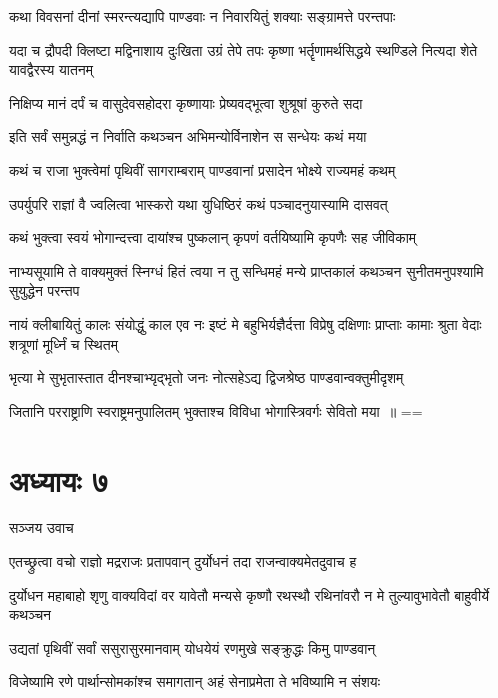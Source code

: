 \twolineshloka
{कथा विवसनां दीनां स्मरन्त्यद्यापि पाण्डवाः}
{न निवारयितुं शक्याः सङ्ग्रामत्ते परन्तपाः}


\threelineshloka
{यदा च द्रौपदी क्लिष्टा मद्विनाशाय दुःखिता}
{उग्रं तेपे तपः कृष्णा भर्तॄणामर्थसिद्धये}
{स्थण्डिले नित्यदा शेते यावद्वैरस्य यातनम्}


\twolineshloka
{निक्षिप्य मानं दर्पं च वासुदेवसहोदरा}
{कृष्णायाः प्रेष्यवद्भूत्वा शुश्रूषां कुरुते सदा}


\twolineshloka
{इति सर्वं समुन्नद्धं न निर्वाति कथञ्चन}
{अभिमन्योर्विनाशेन स सन्धेयः कथं मया}


\twolineshloka
{कथं च राजा भुक्त्वेमां पृथिवीं सागराम्बराम्}
{पाण्डवानां प्रसादेन भोक्ष्ये राज्यमहं कथम्}


\twolineshloka
{उपर्युपरि राज्ञां वै ज्वलित्वा भास्करो यथा}
{युधिष्ठिरं कथं पञ्चादनुयास्यामि दासवत्}


\twolineshloka
{कथं भुक्त्वा स्वयं भोगान्दत्त्वा दायांश्च पुष्कलान्}
{कृपणं वर्तयिष्यामि कृपणैः सह जीविकाम्}


नाभ्यसूयामि ते वाक्यमुक्तं स्निग्धं हितं त्वया
\twolineshloka
{न तु सन्धिमहं मन्ये प्राप्तकालं कथञ्चन}
{सुनीतमनुपश्यामि सुयुद्धेन परन्तप}


नायं क्लीबायितुं कालः संयोद्धुं काल एव नः
\twolineshloka
{इष्टं मे बहुभिर्यज्ञैर्दत्ता विप्रेषु दक्षिणाः}
{प्राप्ताः कामाः श्रुता वेदाः शत्रूणां मूर्ध्निं च स्थितम्}


\twolineshloka
{भृत्या मे सुभृतास्तात दीनश्चाभ्यृद्भृतो जनः}
{नोत्सहेऽद्य द्विजश्रेष्ठ पाण्डवान्वक्तुमीदृशम्}


\twolineshloka
{जितानि परराष्ट्राणि स्वराष्ट्रमनुपालितम्}
{भुक्ताश्च विविधा भोगास्त्रिवर्गः सेवितो मया ॥ ==}


\chapter{अध्यायः ७}
\twolineshloka
{सञ्जय उवाच}
{}


\twolineshloka
{एतच्छ्रुत्वा वचो राज्ञो मद्रराजः प्रतापवान्}
{दुर्योधनं तदा राजन्वाक्यमेतदुवाच ह}


\threelineshloka
{दुर्योधन महाबाहो शृणु वाक्यविदां वर}
{यावेतौ मन्यसे कृष्णौ रथस्थौ रथिनांवरौ}
{न मे तुल्यावुभावेतौ बाहुवीर्ये कथञ्चन}


\twolineshloka
{उद्यतां पृथिवीं सर्वां ससुरासुरमानवाम्}
{योधयेयं रणमुखे सङ्क्रुद्धः किमु पाण्डवान्}


\twolineshloka
{विजेष्यामि रणे पार्थान्सोमकांश्च समागतान्}
{अहं सेनाप्रमेता ते भविष्यामि न संशयः}


